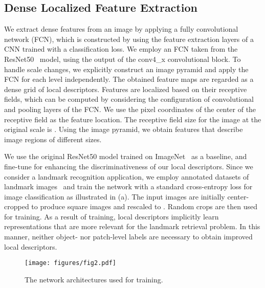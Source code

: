 \documentclass[10pt,twocolumn,letterpaper]{article}
\begin{document}
\subsection{Dense Localized Feature Extraction}
\label{sub:dense}
We extract dense features from an image by applying a fully convolutional network (FCN), which is constructed by using the feature extraction layers of a CNN trained with a classification loss.
We employ an FCN taken from the ResNet50~\cite{he2015deep} model, using the output of
the \textsf{conv4\_x} convolutional block.
To handle scale changes, we explicitly construct an image pyramid and apply the FCN for each level independently.
The obtained feature maps are regarded as a dense grid of local descriptors.
Features are localized based on their receptive fields, which can be computed by considering the configuration of convolutional and pooling layers of the FCN.
We use the pixel coordinates of the center of the receptive field as the feature location.
The receptive field size for the image at the original scale is .
Using the image pyramid, we obtain features that describe image regions of different sizes.



We use the original ResNet50 model trained on ImageNet~\cite{russakovsky2015imagenet} as a baseline, and fine-tune for enhancing the discriminativeness of our local descriptors. 
Since we consider a landmark recognition application, we employ annotated datasets of landmark images~\cite{babenko2014neural} and train the network with a standard cross-entropy loss for image classification as illustrated in (a).
The input images are initially center-cropped to produce square images and rescaled
to .
Random  crops are then used for training.
As a result of training, local descriptors implicitly learn representations that are more relevant for the landmark retrieval problem.
In this manner, neither object- nor patch-level labels are necessary to obtain improved local descriptors.





\begin{figure}[t]
\begin{center}
   \texttt{[image: figures/fig2.pdf]}
\end{center}
	\vspace{-15pt}
\caption{The network architectures used for training.}
\label{fig:train_model}
\vspace{-5pt}                                                                                                                                                                                                           
\end{figure}
\end{document}
